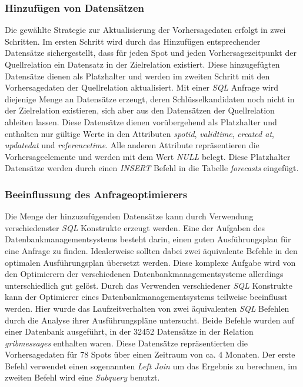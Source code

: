 \subsubsection{Hinzufügen von Datensätzen}
Die gewählte Strategie zur Aktualisierung der Vorhersagedaten erfolgt
in zwei Schritten. Im ersten Schritt wird durch das Hinzufügen
entsprechender Datensätze sichergestellt, dass für jeden Spot und
jeden Vorhersagezeitpunkt der Quellrelation ein Datensatz in der
Zielrelation existiert. Diese hinzugefügten Datensätze dienen als
Platzhalter und werden im zweiten Schritt mit den Vorhersagedaten der
Quellrelation aktualisiert. Mit einer \textit{SQL} Anfrage wird
diejenige Menge an Datensätze erzeugt, deren Schlüsselkandidaten noch
nicht in der Zielrelation existieren, sich aber aus den Datensätzen
der Quellrelation ableiten lassen. Diese Datensätze dienen
vorübergehend als Platzhalter und enthalten nur gültige Werte in den
Attributen \textit{spot\textunderscore id},
\textit{valid\textunderscore time}, \textit{created\textunderscore
  at}, \textit{updated\textunderscore at} und
\textit{reference\textunderscore time}. Alle anderen Attribute
repräsentieren die Vorhersageelemente und werden mit dem Wert
\textit{NULL} belegt. Diese Platzhalter Datensätze werden durch einen
\textit{INSERT} Befehl in die Tabelle \textit{forecasts} eingefügt.

\subsubsection{Beeinflussung des Anfrageoptimierers}
Die Menge der hinzuzufügenden Datensätze kann durch Verwendung
verschiedenster \textit{SQL} Konstrukte erzeugt werden. Eine der
Aufgaben des Datenbankmanagementsystems besteht darin, einen guten
Ausführungsplan für eine Anfrage zu finden. Idealerweise sollten dabei
zwei äquivalente Befehle in den optimalen Ausführungsplan übersetzt
werden. Diese komplexe Aufgabe wird von den Optimierern der
verschiedenen Datenbankmanagementsysteme allerdings unterschiedlich
gut gelöst. Durch das Verwenden verschiedener \textit{SQL} Konstrukte
kann der Optimierer eines Datenbankmanagementsystems teilweise
beeinflusst werden. Hier wurde das Laufzeitverhalten von zwei
äquivalenten \textit{SQL} Befehlen durch die Analyse ihrer
Ausführungspläne untersucht. Beide Befehle wurden auf einer Datenbank
ausgeführt, in der 32452 Datensätze in der Relation
\textit{grib\textunderscore messages} enthalten waren. Diese
Datensätze repräsentierten die Vorhersagedaten für 78 Spots über einen
Zeitraum von ca. 4 Monaten. Der erste Befehl verwendet einen
sogenannten \textit{Left Join} um das Ergebnis zu berechnen, im
zweiten Befehl wird eine \textit{Subquery} benutzt.

